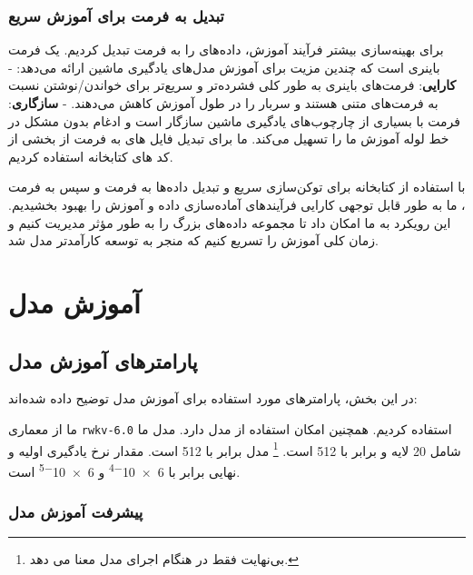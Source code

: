 \subsubsection{تبدیل به فرمت  برای آموزش سریع}

برای بهینه‌سازی بیشتر فرآیند آموزش، داده‌های  را به فرمت  تبدیل
کردیم.  یک فرمت باینری است که چندین مزیت برای آموزش مدل‌های یادگیری
ماشین ارائه می‌دهد: - \textbf{کارایی}: فرمت‌های باینری به طور کلی فشرده‌تر
و سریع‌تر برای خواندن/نوشتن نسبت به فرمت‌های متنی هستند و سربار  را در
طول آموزش کاهش می‌دهند. - \textbf{سازگاری}: فرمت  با بسیاری از
چارچوب‌های یادگیری ماشین سازگار است و ادغام بدون مشکل در خط لوله آموزش ما
را تسهیل می‌کند. ما برای تبدیل فایل های  به فرمت  از بخشی از کد های کتابخانه  \cite{gpt-neox-library} استفاده کردیم.

با استفاده از کتابخانه  برای توکن‌سازی سریع و تبدیل داده‌ها به
فرمت  و سپس به فرمت ، ما به طور قابل توجهی کارایی فرآیندهای
آماده‌سازی داده و آموزش را بهبود بخشیدیم. این رویکرد به ما امکان داد تا
مجموعه داده‌های بزرگ را به طور مؤثر مدیریت کنیم و زمان کلی آموزش را تسریع
کنیم که منجر به توسعه کارآمدتر مدل شد.

\section{آموزش مدل}
\subsection{پارامترهای آموزش مدل}
در این بخش، پارامترهای مورد استفاده برای آموزش مدل توضیح داده شده‌اند:

ما از معماری \texttt{rwkv-6.0} \cite{peng2024eagle} استفاده کردیم. همچنین
امکان استفاده از مدل دارد. مدل ما شامل 20 لایه و
 برابر با 512 است.  \footnote{ بی‌نهایت فقط در هنگام اجرای مدل معنا می  دهد.} مدل برابر با
512 است.
مقدار نرخ یادگیری اولیه و نهایی برابر با \num{6e-4}   و \num{6e-5} است.
\subsubsection{پیشرفت آموزش مدل}

